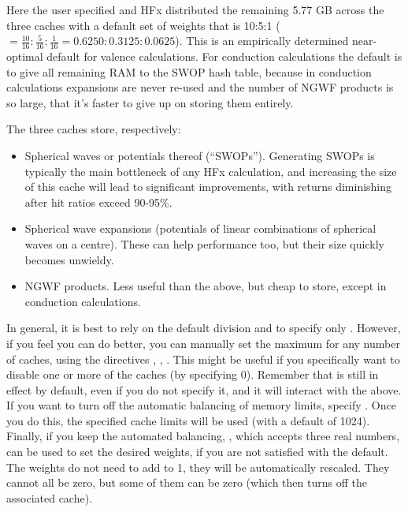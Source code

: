 \documentclass[letterpaper,10pt,english]{sphinxmanual}
\begin{document}
Here the user specified  and HFx distributed
the remaining 5.77 GB across the three caches with a default set of
weights that is 10:5:1
(\(=\frac{10}{16}:\frac{5}{16}:\frac{1}{16}=0.6250:0.3125:0.0625\)).
This is an empirically determined near-optimal default for valence
calculations. For conduction calculations the default is to give all
remaining RAM to the SWOP hash table, because in conduction calculations
expansions are never re-used and the number of NGWF products is so
large, that it’s faster to give up on storing them entirely.

The three caches store, respectively:
\begin{itemize}
\item {} 
Spherical waves or potentials thereof (“SWOPs”). Generating SWOPs is
typically the main bottleneck of any HFx calculation, and increasing
the size of this cache will lead to significant improvements, with
returns diminishing after hit ratios exceed 90-95\%.

\item {} 
Spherical wave expansions (potentials of linear combinations of
spherical waves on a centre). These can help performance too, but
their size quickly becomes unwieldy.

\item {} 
NGWF products. Less useful than the above, but cheap to store, except
in conduction calculations.

\end{itemize}

In general, it is best to rely on the default division and to specify
only . However, if you feel you can do better, you
can manually set the maximum for any number of caches, using the
directives , ,
. This might be useful if you specifically want
to disable one or more of the caches (by specifying 0). Remember that
 is still in effect by default, even if you do not
specify it, and it will interact with the above. If you want to turn off
the automatic balancing of memory limits, specify
. Once you do this, the specified cache limits
will be used (with a default of 1024). Finally, if you keep the
automated balancing, , which accepts three real
numbers, can be used to set the desired weights, if you are not
satisfied with the default. The weights do not need to add to 1, they
will be automatically rescaled. They cannot all be zero, but some of
them can be zero (which then turns off the associated cache).
\end{document}
